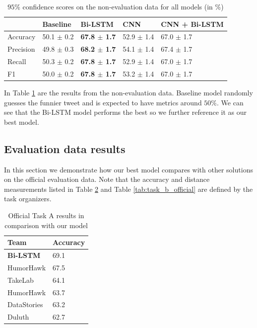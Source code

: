 \documentclass[10pt, a4paper]{article}
\begin{document}
\begin{table}
\scriptsize
    \caption{$95\%$ confidence scores on the non-evaluation data for all models
    (in $\%$)}
 \label{tab:conf_95_dev}
 \begin{center}
 \begin{tabular}{l|llll}
 \toprule
     & Baseline & Bi-LSTM & CNN & CNN + Bi-LSTM\\
 \midrule
     Accuracy & 50.1 $\pm$ 0.2 & \textbf{67.8 $\pm$ 1.7} & 52.9 $\pm$ 1.4  & 67.0 $\pm$
     1.7\\

     Precision & 49.8 $\pm$ 0.3 & \textbf{68.2 $\pm$ 1.7}  & 54.1 $\pm$ 1.4& 67.4 $\pm$ 1.7\\
     Recall & 50.3 $\pm$ 0.2 & \textbf{67.8 $\pm$ 1.7} & 52.9 $\pm$ 1.4& 67.0 $\pm$ 1.7\\

     F1 & 50.0 $\pm$ 0.2 & \textbf{67.8 $\pm$ 1.7}  & 53.2 $\pm$ 1.4 & 67.0 $\pm$ 1.7\\

 \bottomrule
 \end{tabular}
 \end{center}
\end{table}

In Table \ref{tab:conf_95_dev} are the results from the non-evaluation data.
Baseline model randomly guesses the funnier tweet and is expected to have
metrics around $50\%$. We can see that the Bi-LSTM model performs the best so
we further reference it as our best model.

\subsection{Evaluation data results}
In this section we demonstrate how our best model compares with other solutions on the official
evaluation data. Note that the accuracy and distance measurements listed in
Table \ref{tab:task_a_official} and Table \ref{tab:task_b_official} are
defined by the task organizers\citep{potash2016hashtagwars}.

\begin{table}
  \caption{Official Task A results in comparison with our model}
 \label{tab:task_a_official}
 \begin{center}
 \begin{tabular}{ll}
 \toprule
     Team & Accuracy\\
 \midrule
     \textbf{Bi-LSTM} & 69.1 \\
     HumorHawk & 67.5 \\
     TakeLab & 64.1\\
     HumorHawk & 63.7\\
     DataStories & 63.2\\
     Duluth & 62.7\\
 \bottomrule
 \end{tabular}
 \end{center}
\end{table}
\end{document}

